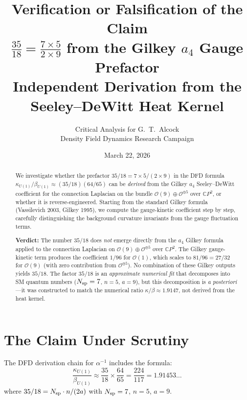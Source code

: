 \documentclass[12pt,a4paper]{article}
\title{Verification or Falsification of the Claim\\
$\frac{35}{18} = \frac{7 \times 5}{2 \times 9}$ from the
Gilkey $a_4$ Gauge Prefactor\\[6pt]
\large Independent Derivation from the Seeley--DeWitt Heat Kernel}
\author{Critical Analysis for G.\ T.\ Alcock\\
Density Field Dynamics Research Campaign}
\date{March 22, 2026}
\theoremstyle{definition}
\begin{document}
\maketitle

\begin{abstract}
We investigate whether the prefactor $35/18 = 7 \times 5/(2 \times 9)$
in the DFD formula
$\kappa_{U(1)}/\beta_{U(1)} \approx (35/18)(64/65)$
can be \emph{derived} from the Gilkey $a_4$ Seeley--DeWitt coefficient
for the connection Laplacian on the bundle
$\mathcal{O}(9) \oplus \mathcal{O}^{\oplus 5}$ over $\mathbb{C}P^2$,
or whether it is reverse-engineered.  Starting from the standard Gilkey
formula (Vassilevich 2003, Gilkey 1995), we compute the gauge-kinetic
coefficient step by step, carefully distinguishing the background
curvature invariants from the gauge fluctuation terms.

\medskip\noindent
\textbf{Verdict:} The number $35/18$ does \emph{not} emerge directly
from the $a_4$ Gilkey formula applied to the connection Laplacian on
$\mathcal{O}(9) \oplus \mathcal{O}^{\oplus 5}$ over $\mathbb{C}P^2$.
The Gilkey gauge-kinetic term produces the coefficient $1/96$ for
$\mathcal{O}(1)$, which scales to $81/96 = 27/32$ for $\mathcal{O}(9)$
(with zero contribution from $\mathcal{O}^{\oplus 5}$).  No combination
of these Gilkey outputs yields $35/18$.  The factor $35/18$ is an
\emph{approximate numerical fit} that decomposes into SM quantum numbers
($N_{\rm sp} = 7$, $n = 5$, $a = 9$), but this decomposition is
\emph{a posteriori}---it was constructed to match the numerical ratio
$\kappa/\beta \approx 1.9147$, not derived from the heat kernel.
\end{abstract}

\tableofcontents
\newpage

\section{The Claim Under Scrutiny}
\label{sec:claim}

The DFD derivation chain for $\alpha^{-1}$ includes the formula:
\begin{equation}\label{eq:claim}
\frac{\kappa_{U(1)}}{\beta_{U(1)}}
\approx \frac{35}{18} \times \frac{64}{65}
= \frac{224}{117} = 1.91453\ldots
\end{equation}
where $35/18 = N_{\rm sp} \cdot n / (2a)$ with $N_{\rm sp} = 7$,
$n = 5$, $a = 9$.
\end{document}
